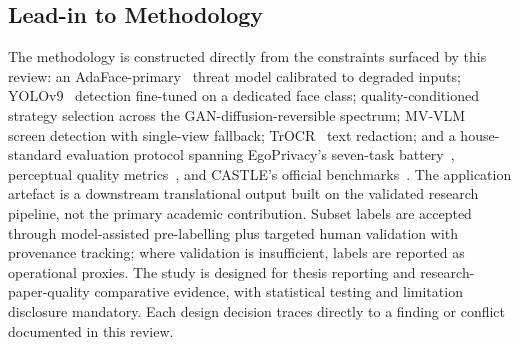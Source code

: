 \documentclass[10pt, twocolumn]{IEEEtran}
\begin{document}
\subsection{Lead-in to Methodology}

The methodology is constructed directly from the constraints surfaced by this review: an AdaFace-primary~\cite{kim2022adaface} threat model calibrated to degraded inputs; YOLOv9~\cite{wang2024yolov9} detection fine-tuned on a dedicated face class; quality-conditioned strategy selection across the GAN-diffusion-reversible spectrum; MV-VLM~\cite{li2026screen} screen detection with single-view fallback; TrOCR~\cite{li2023trocr} text redaction; and a house-standard evaluation protocol spanning EgoPrivacy's seven-task battery~\cite{li2025egoprivacy}, perceptual quality metrics~\cite{heusel2017fid,zhang2018lpips,wang2004ssim}, and CASTLE's official benchmarks~\cite{rossetto2025castle}. The application artefact is a downstream translational output built on the validated research pipeline, not the primary academic contribution. Subset labels are accepted through model-assisted pre-labelling plus targeted human validation with provenance tracking; where validation is insufficient, labels are reported as operational proxies. The study is designed for thesis reporting and research-paper-quality comparative evidence, with statistical testing and limitation disclosure mandatory. Each design decision traces directly to a finding or conflict documented in this review.


\begingroup
\footnotesize
\setlength{\itemsep}{0pt}
\setlength{\parskip}{0pt}
\renewcommand*{\bibfont}{\footnotesize}
\printbibliography
\endgroup
\end{document}
